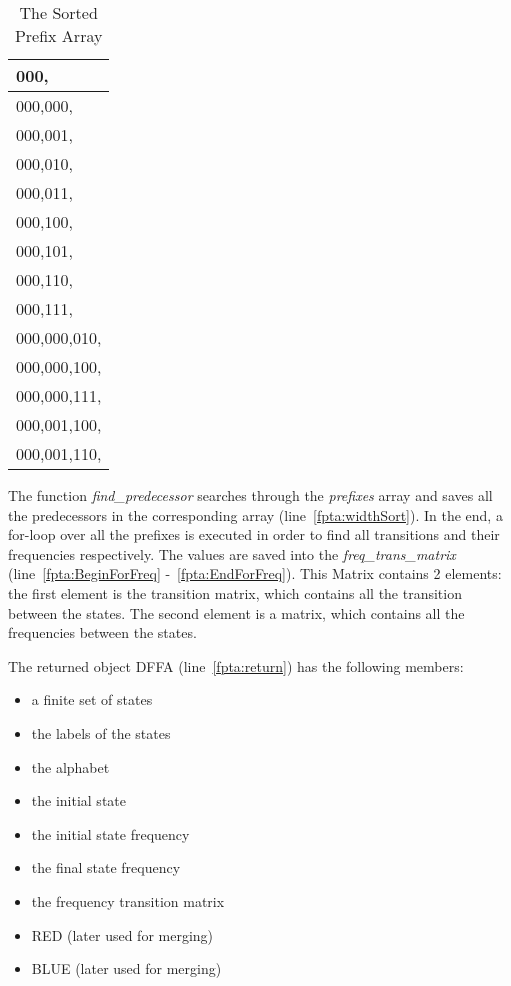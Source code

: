 \documentclass[
a4paper,     %
12pt         %
]{scrartcl}  %
\begin{document}
\begin{table}[ht!]
\centering
\begin{tabular}{|l|}
\hline
000,         \\ \hline
000,000,     \\ \hline
000,001,     \\ \hline
000,010,     \\ \hline
000,011,     \\ \hline
000,100,     \\ \hline
000,101,     \\ \hline
000,110,     \\ \hline
000,111,     \\ \hline
000,000,010, \\ \hline
000,000,100, \\ \hline
000,000,111, \\ \hline
000,001,100, \\ \hline
000,001,110, \\ \hline
\end{tabular}
\caption{The Sorted Prefix Array} 
\label{table:sortPrefix}
\end{table}

The function \emph{find\_predecessor} searches through the \emph{prefixes} array and saves all the predecessors in the corresponding array (line~\ref{fpta:widthSort}). In the end, a for-loop over all the prefixes is executed in order to find all transitions and their frequencies respectively. The values are saved into the \emph{freq\_trans\_matrix}  (line~\ref{fpta:BeginForFreq} -~\ref{fpta:EndForFreq}). This Matrix contains 2 elements: the first element is the transition matrix, which contains all the transition between the states. The second element is a matrix, which contains all the frequencies between the states. 

The returned object DFFA (line~\ref{fpta:return}) has the following members:
\begin{itemize}
      \item a finite set of states
      \item the labels of the states
      \item the alphabet
      \item the initial state
      \item the initial state frequency
      \item the final state frequency
      \item the frequency transition matrix
      \item RED (later used for merging)
      \item BLUE (later used for merging)
   \end{itemize}
\end{document}
